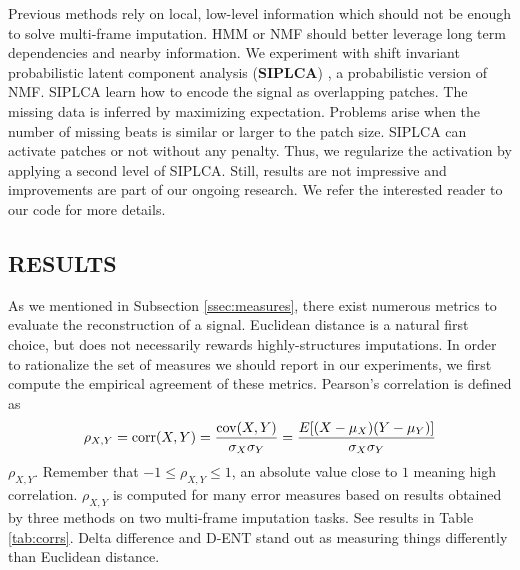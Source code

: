 \documentclass{article}
\begin{document}
Previous methods rely on local, low-level information which should not
be enough to solve multi-frame imputation. HMM or NMF should better
leverage long term dependencies and nearby information.  We experiment
with shift invariant probabilistic latent component analysis
(\textbf{SIPLCA}) \cite{Smaragdis2009,Weiss2010}, a probabilistic
version of NMF. SIPLCA learn how to encode the signal as overlapping
patches. The missing data is inferred by maximizing expectation.
Problems arise when the number of missing beats is similar or larger
to the patch size. SIPLCA can activate patches or not without any
penalty. Thus, we regularize the activation by applying a second level
of SIPLCA.  Still, results are not impressive and improvements are
part of our ongoing research. We refer the interested reader to our
code for more details.



\subsection{RESULTS}
\label{ssec:results}
As we mentioned in Subsection \ref{ssec:measures}, there exist
numerous metrics to evaluate the reconstruction of a signal. Euclidean
distance is a natural first choice, but does not necessarily rewards
highly-structures imputations. In order to rationalize the set of
measures we should report in our experiments, we first compute the
empirical agreement of these metrics.
Pearson's correlation is defined as
\[  \rho_{X,Y}=\mathrm{corr}(X,Y)={\mathrm{cov}(X,Y) \over \sigma_X
    \sigma_Y} ={E[(X-\mu_X)(Y-\mu_Y)] \over \sigma_X\sigma_Y}
\]
$\rho_{X,Y}$. Remember that $-1 \leq \rho_{X,Y} \leq 1$, an absolute
value close to $1$ meaning high correlation. $\rho_{X,Y}$ is computed
for many error measures based on results obtained by three methods on
two multi-frame imputation tasks. See results in Table
\ref{tab:corrs}. Delta difference and D-ENT stand out as measuring
things differently than Euclidean distance.
\end{document}
